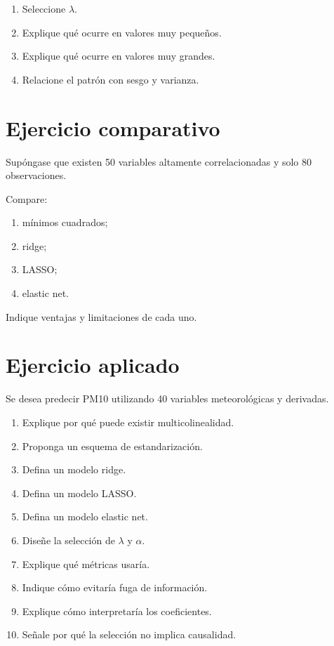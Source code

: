 \documentclass[
  spanish,
  11pt,
  letterpaper,
  DIV=11,
  numbers=noendperiod]{scrreprt}
\providecommand{\tightlist}{%
  \setlength{\itemsep}{0pt}\setlength{\parskip}{0pt}}
\theoremstyle{definition}
\theoremstyle{plain}
\theoremstyle{definition}
\theoremstyle{remark}
\begin{document}
\begin{enumerate}
\def\labelenumi{\arabic{enumi}.}
\tightlist
\item
  Seleccione \(\lambda\).
\item
  Explique qué ocurre en valores muy pequeños.
\item
  Explique qué ocurre en valores muy grandes.
\item
  Relacione el patrón con sesgo y varianza.
\end{enumerate}

\section{Ejercicio comparativo}\label{ejercicio-comparativo}

Supóngase que existen 50 variables altamente correlacionadas y solo 80
observaciones.

Compare:

\begin{enumerate}
\def\labelenumi{\arabic{enumi}.}
\tightlist
\item
  mínimos cuadrados;
\item
  ridge;
\item
  LASSO;
\item
  elastic net.
\end{enumerate}

Indique ventajas y limitaciones de cada uno.

\section{Ejercicio aplicado}\label{ejercicio-aplicado-5}

Se desea predecir PM10 utilizando 40 variables meteorológicas y
derivadas.

\begin{enumerate}
\def\labelenumi{\arabic{enumi}.}
\tightlist
\item
  Explique por qué puede existir multicolinealidad.
\item
  Proponga un esquema de estandarización.
\item
  Defina un modelo ridge.
\item
  Defina un modelo LASSO.
\item
  Defina un modelo elastic net.
\item
  Diseñe la selección de \(\lambda\) y \(\alpha\).
\item
  Explique qué métricas usaría.
\item
  Indique cómo evitaría fuga de información.
\item
  Explique cómo interpretaría los coeficientes.
\item
  Señale por qué la selección no implica causalidad.
\end{enumerate}
\end{document}
